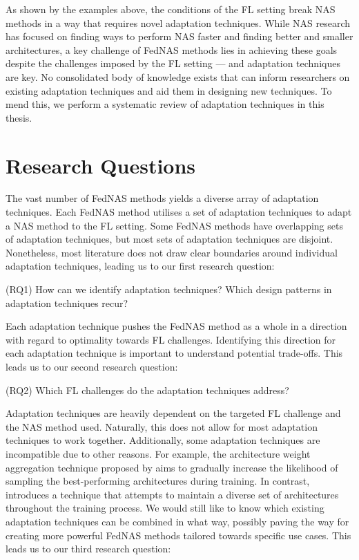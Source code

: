 As shown by the examples above, the conditions of the FL setting break NAS methods in a way that requires novel adaptation techniques. While NAS research has focused on finding ways to perform NAS faster and finding better and smaller architectures, a key challenge of FedNAS methods lies in achieving these goals despite the challenges imposed by the FL setting — and adaptation techniques are key. No consolidated body of knowledge exists that can inform researchers on existing adaptation techniques and aid them in designing new techniques. To mend this, we perform a systematic review of adaptation techniques in this thesis. 

\section{Research Questions}

The vast number of FedNAS methods yields a diverse array of adaptation techniques. Each FedNAS method utilises a set of adaptation techniques to adapt a NAS method to the FL setting. Some FedNAS methods have overlapping sets of adaptation techniques, but most sets of adaptation techniques are disjoint. Nonetheless, most literature does not draw clear boundaries around individual adaptation techniques, leading us to our first research question:

\vspace{1em}
(RQ1) How can we identify adaptation techniques? Which design patterns in adaptation techniques recur?
\vspace{1em}

Each adaptation technique pushes the FedNAS method as a whole in a direction with regard to optimality towards FL challenges. Identifying this direction for each adaptation technique is important to understand potential trade-offs. This leads us to our second research question:

\vspace{1em}
(RQ2) Which FL challenges do the adaptation techniques address?
\vspace{1em}

Adaptation techniques are heavily dependent on the targeted FL challenge and the NAS method used. Naturally, this does not allow for most adaptation techniques to work together. Additionally, some adaptation techniques are incompatible due to other reasons. For example, the architecture weight aggregation technique proposed by \cite{efnas_2024} aims to gradually increase the likelihood of sampling the best-performing architectures during training. In contrast, \cite{superfednas_2024} introduces a technique that attempts to maintain a diverse set of architectures throughout the training process. We would still like to know which existing adaptation techniques can be combined in what way, possibly paving the way for creating more powerful FedNAS methods tailored towards specific use cases. This leads us to our third research question:

